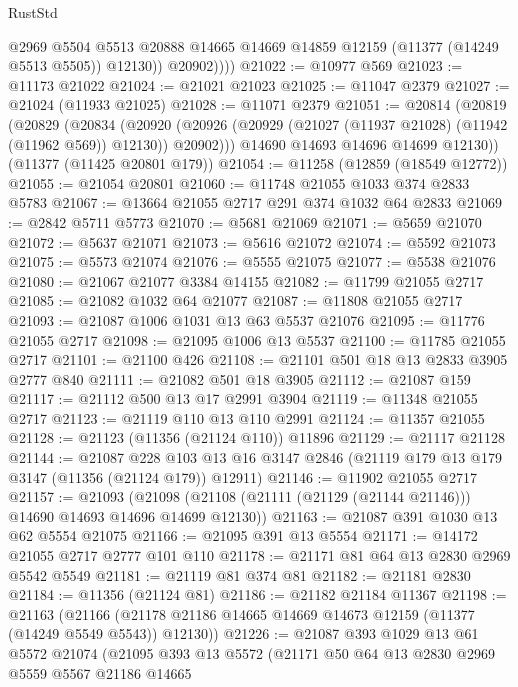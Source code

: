 \begin{lexlean}{RustStd}
\begin{coremodule}
                @2969
                @5504
                @5513
                @20888
                @14665
                @14669
                @14859
                @12159
                (@11377 (@14249 @5513 @5505))
                @12130))
            @20902))))
@21022 := @10977 @569
@21023 := @11173 @21022
@21024 := @21021 @21023
@21025 := @11047 @2379
@21027 := @21024 (@11933 @21025)
@21028 := @11071 @2379
@21051 := @20814
    (@20819
      (@20829
        (@20834
          (@20920 (@20926 (@20929 (@21027 (@11937 @21028) (@11942 (@11962 @569)) @12130)) @20902)))
        @14690
        @14693
        @14696
        @14699
        @12130))
    (@11377 (@11425 @20801 @179))
@21054 := @11258 (@12859 (@18549 @12772))
@21055 := @21054 @20801
@21060 := @11748 @21055 @1033 @374 @2833 @5783
@21067 := @13664 @21055 @2717 @291 @374 @1032 @64 @2833
@21069 := @2842 @5711 @5773
@21070 := @5681 @21069
@21071 := @5659 @21070
@21072 := @5637 @21071
@21073 := @5616 @21072
@21074 := @5592 @21073
@21075 := @5573 @21074
@21076 := @5555 @21075
@21077 := @5538 @21076
@21080 := @21067 @21077 @3384 @14155
@21082 := @11799 @21055 @2717
@21085 := @21082 @1032 @64 @21077
@21087 := @11808 @21055 @2717
@21093 := @21087 @1006 @1031 @13 @63 @5537 @21076
@21095 := @11776 @21055 @2717
@21098 := @21095 @1006 @13 @5537
@21100 := @11785 @21055 @2717
@21101 := @21100 @426
@21108 := @21101 @501 @18 @13 @2833 @3905 @2777 @840
@21111 := @21082 @501 @18 @3905
@21112 := @21087 @159
@21117 := @21112 @500 @13 @17 @2991 @3904
@21119 := @11348 @21055 @2717
@21123 := @21119 @110 @13 @110 @2991
@21124 := @11357 @21055
@21128 := @21123 (@11356 (@21124 @110)) @11896
@21129 := @21117 @21128
@21144 := @21087
    @228
    @103
    @13
    @16
    @3147
    @2846
    (@21119 @179 @13 @179 @3147 (@11356 (@21124 @179)) @12911)
@21146 := @11902 @21055 @2717
@21157 := @21093
    (@21098 (@21108 (@21111 (@21129 (@21144 @21146))) @14690 @14693 @14696 @14699 @12130))
@21163 := @21087 @391 @1030 @13 @62 @5554 @21075
@21166 := @21095 @391 @13 @5554
@21171 := @14172 @21055 @2717 @2777 @101 @110
@21178 := @21171 @81 @64 @13 @2830 @2969 @5542 @5549
@21181 := @21119 @81 @374 @81
@21182 := @21181 @2830
@21184 := @11356 (@21124 @81)
@21186 := @21182 @21184 @11367
@21198 := @21163
    (@21166 (@21178 @21186 @14665 @14669 @14673 @12159 (@11377 (@14249 @5549 @5543)) @12130))
@21226 := @21087
    @393
    @1029
    @13
    @61
    @5572
    @21074
    (@21095
      @393
      @13
      @5572
      (@21171
        @50
        @64
        @13
        @2830
        @2969
        @5559
        @5567
        @21186
        @14665

\end{coremodule}
\end{lexlean}
